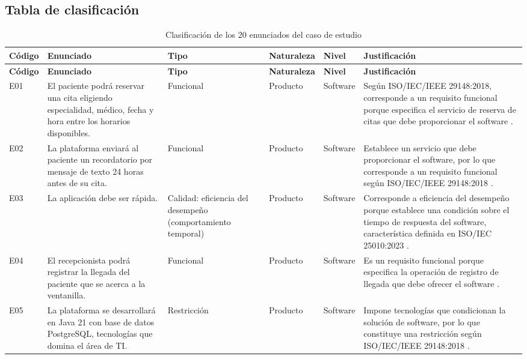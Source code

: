 \documentclass[12pt,a4paper,oneside]{article}
\begin{document}
\subsection{Tabla de clasificación}

\small
\begin{longtable}{
    C{1.25cm}
    L{3.5cm}
    L{2.2cm}
    C{1.7cm}
    C{1.35cm}
    L{4.5cm}
}
\caption{Clasificación de los 20 enunciados del caso de estudio}
\label{tab:clasificacion}\\

\toprule
\textbf{Código} &
\textbf{Enunciado} &
\textbf{Tipo} &
\textbf{Naturaleza} &
\textbf{Nivel} &
\textbf{Justificación} \\
\midrule
\endfirsthead


\toprule
\textbf{Código} &
\textbf{Enunciado} &
\textbf{Tipo} &
\textbf{Naturaleza} &
\textbf{Nivel} &
\textbf{Justificación} \\
\midrule
\endhead

\bottomrule
\endfoot
E01 &
El paciente podrá reservar una cita eligiendo especialidad,
médico, fecha y hora entre los horarios disponibles. &
Funcional &
Producto &
Software &
Según ISO/IEC/IEEE 29148:2018, corresponde a un requisito
funcional porque especifica el servicio de reserva de citas
que debe proporcionar el software \cite{ieee29148}. \\

E02 &
La plataforma enviará al paciente un recordatorio por mensaje
de texto 24 horas antes de su cita. &
Funcional &
Producto &
Software &
Establece un servicio que debe proporcionar el software,
por lo que corresponde a un requisito funcional según
ISO/IEC/IEEE 29148:2018 \cite{ieee29148}. \\

E03 &
La aplicación debe ser rápida. &
Calidad: eficiencia del desempeño
(comportamiento temporal) &
Producto &
Software &
Corresponde a eficiencia del desempeño porque establece
una condición sobre el tiempo de respuesta del software,
característica definida en ISO/IEC 25010:2023
\cite{iso25010}. \\

E04 &
El recepcionista podrá registrar la llegada del paciente que
se acerca a la ventanilla. &
Funcional &
Producto &
Software &
Es un requisito funcional porque especifica la operación
de registro de llegada que debe ofrecer el software
\cite{ieee29148}. \\

E05 &
La plataforma se desarrollará en Java 21 con base de datos
PostgreSQL, tecnologías que domina el área de TI. &
Restricción &
Producto &
Software &
Impone tecnologías que condicionan la solución de software,
por lo que constituye una restricción según
ISO/IEC/IEEE 29148:2018 \cite{ieee29148}. \\


\end{longtable}
\end{document}
